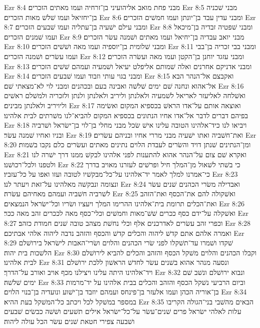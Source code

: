Ezr 8:4  מבני פחת מואב אליהועיני בן־זרחיה ועמו מאתים הזכרים׃
Ezr 8:5  מבני שׁכניה בן־יחזיאל ועמו שׁלשׁ מאות הזכרים׃
Ezr 8:6  ומבני עדין עבד בן־יונתן ועמו חמשׁים הזכרים׃
Ezr 8:7  ומבני עילם ישׁעיה בן־עתליה ועמו שׁבעים הזכרים׃
Ezr 8:8  ומבני שׁפטיה זבדיה בן־מיכאל ועמו שׁמנים הזכרים׃
Ezr 8:9  מבני יואב עבדיה בן־יחיאל ועמו מאתים ושׁמנה עשׂר הזכרים׃
Ezr 8:10  ומבני שׁלומית בן־יוספיה ועמו מאה ושׁשׁים הזכרים׃
Ezr 8:11  ומבני בבי זכריה בן־בבי ועמו עשׂרים ושׁמנה הזכרים׃
Ezr 8:12  ומבני עזגד יוחנן בן־הקטן ועמו מאה ועשׂרה הזכרים׃
Ezr 8:13  ומבני אדניקם אחרנים ואלה שׁמותם אליפלט יעיאל ושׁמעיה ועמהם שׁשׁים הזכרים׃
Ezr 8:14  ומבני בגוי עותי וזבוד ועמו שׁבעים הזכרים׃
Ezr 8:15  ואקבצם אל־הנהר הבא אל־אהוא ונחנה שׁם ימים שׁלשׁה ואבינה בעם ובכהנים ומבני לוי לא־מצאתי שׁם׃
Ezr 8:16  ואשׁלחה לאליעזר לאריאל לשׁמעיה ולאלנתן וליריב ולאלנתן ולנתן ולזכריה ולמשׁלם ראשׁים וליויריב ולאלנתן מבינים׃
Ezr 8:17  ואוצאה אותם על־אדו הראשׁ בכספיא המקום ואשׂימה בפיהם דברים לדבר אל־אדו אחיו הנתונים בכספיא המקום להביא־לנו משׁרתים לבית אלהינו׃
Ezr 8:18  ויביאו לנו כיד־אלהינו הטובה עלינו אישׁ שׂכל מבני מחלי בן־לוי בן־ישׂראל ושׁרביה ובניו ואחיו שׁמנה עשׂר׃
Ezr 8:19  ואת־חשׁביה ואתו ישׁעיה מבני מררי אחיו ובניהם עשׂרים׃
Ezr 8:20  ומן־הנתינים שׁנתן דויד והשׂרים לעבדת הלוים נתינים מאתים ועשׂרים כלם נקבו בשׁמות׃
Ezr 8:21  ואקרא שׁם צום על־הנהר אהוא להתענות לפני אלהינו לבקשׁ ממנו דרך ישׁרה לנו ולטפנו ולכל־רכושׁנו׃
Ezr 8:22  כי בשׁתי לשׁאול מן־המלך חיל ופרשׁים לעזרנו מאויב בדרך כי־אמרנו למלך לאמר יד־אלהינו על־כל־מבקשׁיו לטובה ועזו ואפו על כל־עזביו׃
Ezr 8:23  ונצומה ונבקשׁה מאלהינו על־זאת ויעתר לנו׃
Ezr 8:24  ואבדילה משׂרי הכהנים שׁנים עשׂר לשׁרביה חשׁביה ועמהם מאחיהם עשׂרה׃
Ezr 8:25  ואשׁקולה להם את־הכסף ואת־הזהב ואת־הכלים תרומת בית־אלהינו ההרימו המלך ויעציו ושׂריו וכל־ישׂראל הנמצאים׃
Ezr 8:26  ואשׁקלה על־ידם כסף ככרים שׁשׁ־מאות וחמשׁים וכלי־כסף מאה לככרים זהב מאה ככר׃
Ezr 8:27  וכפרי זהב עשׂרים לאדרכנים אלף וכלי נחשׁת מצהב טובה שׁנים חמודת כזהב׃
Ezr 8:28  ואמרה אלהם אתם קדשׁ ליהוה והכלים קדשׁ והכסף והזהב נדבה ליהוה אלהי אבתיכם׃
Ezr 8:29  שׁקדו ושׁמרו עד־תשׁקלו לפני שׂרי הכהנים והלוים ושׂרי־האבות לישׂראל בירושׁלם הלשׁכות בית יהוה׃
Ezr 8:30  וקבלו הכהנים והלוים משׁקל הכסף והזהב והכלים להביא לירושׁלם לבית אלהינו׃
Ezr 8:31  ונסעה מנהר אהוא בשׁנים עשׂר לחדשׁ הראשׁון ללכת ירושׁלם ויד־אלהינו היתה עלינו ויצילנו מכף אויב ואורב על־הדרך׃
Ezr 8:32  ונבוא ירושׁלם ונשׁב שׁם ימים שׁלשׁה׃
Ezr 8:33  וביום הרביעי נשׁקל הכסף והזהב והכלים בבית אלהינו על יד־מרמות בן־אוריה הכהן ועמו אלעזר בן־פינחס ועמהם יוזבד בן־ישׁוע ונועדיה בן־בנוי הלוים׃
Ezr 8:34  במספר במשׁקל לכל ויכתב כל־המשׁקל בעת ההיא׃
Ezr 8:35  הבאים מהשׁבי בני־הגולה הקריבו עלות לאלהי ישׂראל פרים שׁנים־עשׂר על־כל־ישׂראל אילים תשׁעים ושׁשׁה כבשׂים שׁבעים ושׁבעה צפירי חטאת שׁנים עשׂר הכל עולה ליהוה׃
